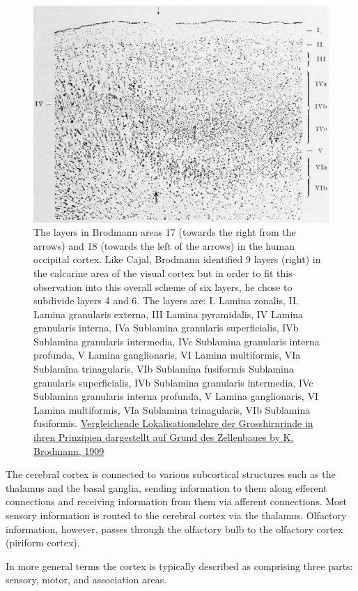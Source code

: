 \begin{figure}

{\centering \includegraphics[width=0.7\linewidth]{./figures/cns/cortex_area_17_18} 

}

\caption{The layers in Brodmann areas 17 (towards the right from the arrows) and 18 (towards the left of the arrows) in the human occipital cortex. Like Cajal, Brodmann identified 9 layers (right) in the calcarine area of the visual cortex but in order to fit this observation into this overall scheme of six layers, he chose to subdivide layers 4 and 6. The layers are: I. Lamina zonalis, II. Lamina granularis externa, III Lamina pyramidalis, IV Lamina granularis interna, IVa Sublamina granularis superficialis, IVb Sublamina granularis intermedia, IVc Sublamina granularis interna profunda, V Lamina ganglionaris, VI Lamina multiformis, VIa Sublamina trinagularis, VIb Sublamina fusiformis Sublamina granularis superficialis, IVb Sublamina granularis intermedia, IVc Sublamina granularis interna profunda, V Lamina ganglionaris, VI Lamina multiformis, VIa Sublamina trinagularis, VIb Sublamina fusiformis. \href{https://wellcomelibrary.org/item/b28062449}{Vergleichende Lokalisationslehre der Grosshirnrinde in ihren Prinzipien dargestellt auf Grund des Zellenbaues by K. Brodmann, 1909}}\label{fig:viscortex}
\end{figure}

The cerebral cortex is connected to various subcortical structures such as the thalamus and the basal ganglia, sending information to them along efferent connections and receiving information from them via afferent connections. Most sensory information is routed to the cerebral cortex via the thalamus. Olfactory information, however, passes through the olfactory bulb to the olfactory cortex (piriform cortex).

In more general terms the cortex is typically described as comprising three parts: sensory, motor, and association areas.

